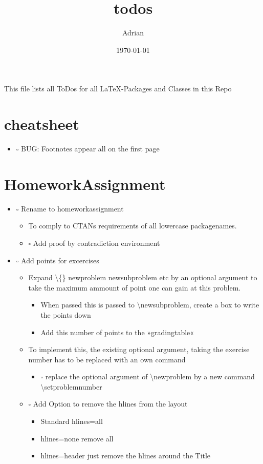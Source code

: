 \documentclass[11pt]{article}
\author{Adrian}
\date{\today}
\title{todos}
\begin{document}
\maketitle
\tableofcontents

This file lists all ToDos for all \LaTeX{}-Packages and Classes in this
 Repo


\section{cheatsheet}
\label{sec-1}
\begin{itemize}
\item $\square$ BUG: Footnotes appear all on the first page
\end{itemize}


\section{HomeworkAssignment}
\label{sec-2}
\begin{itemize}
\item $\square$ Rename to homeworkassignment
\begin{itemize}
\item To comply to CTANs requirements of all lowercase packagenames.
\item $\square$ Add proof by contradiction environment
\end{itemize}
\item $\square$ Add points for excercises
\begin{itemize}
\item Expand \textbackslash \{\} newproblem newsubproblem etc by an
optional argument to take the maximum ammount of point one can
gain at this problem.
\begin{itemize}
\item When passed this is passed to \textbackslash{}newsubproblem,
create a box to write the points down
\item Add this number of points to the »gradingtable«
\end{itemize}
\item To implement this, the existing optional argument, taking
the exercise number has to be replaced with an own command
\begin{itemize}
\item $\square$ replace the optional argument of
\textbackslash{}newproblem by a new command
\textbackslash{}setproblemnumber
\end{itemize}
\item $\square$ Add Option to remove the hlines from the layout
\begin{itemize}
\item Standard hlines=all
\item hlines=none remove all
\item hlines=header just remove the hlines around the Title
\end{itemize}
\end{itemize}
\end{itemize}
\end{document}
